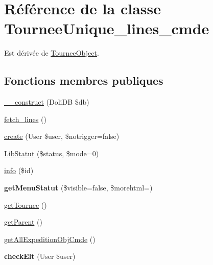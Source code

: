 \hypertarget{classTourneeUnique__lines__cmde}{}\section{Référence de la classe Tournee\+Unique\+\_\+lines\+\_\+cmde}
\label{classTourneeUnique__lines__cmde}


Est dérivée de \hyperlink{classTourneeObject}{Tournee\+Object}.

\subsection*{Fonctions membres publiques}
\begin{DoxyCompactItemize}
\item 
\hyperlink{classTourneeUnique__lines__cmde_aa371ccc9c9e140c39e1c3c64ad705696}{\+\_\+\+\_\+construct} (Doli\+DB \$db)
\item 
\hyperlink{classTourneeUnique__lines__cmde_a1c0accb832ebdf0da38a4c7769bbaf8c}{fetch\+\_\+lines} ()
\item 
\hyperlink{classTourneeUnique__lines__cmde_a1c9c3468a1f595203f05ac1dc8c230e5}{create} (User \$user, \$notrigger=false)
\item 
\hyperlink{classTourneeUnique__lines__cmde_af3dd7a88698021713f3bf14a7e45ecec}{Lib\+Statut} (\$status, \$mode=0)
\item 
\hyperlink{classTourneeUnique__lines__cmde_aa8ad4a8e54f9dfbbf513e6d9f32e2d8f}{info} (\$id)
\item 
\mbox{\label{classTourneeUnique__lines__cmde_a49d3a71fc14480a55491d9775e9a728b}} 
{\bfseries get\+Menu\+Statut} (\$visible=false, \$morehtml=\textquotesingle{}\textquotesingle{})
\item 
\hyperlink{classTourneeUnique__lines__cmde_aabbb2e2e93c17d969aad1261531841d9}{get\+Tournee} ()
\item 
\hyperlink{classTourneeUnique__lines__cmde_aa5efaa5cdbbeb74ea06a132be5af5832}{get\+Parent} ()
\item 
\hyperlink{classTourneeUnique__lines__cmde_aa5eaac268620b600a7693b318a2a596c}{get\+All\+Expedition\+Obj\+Cmde} ()
\item 
\mbox{\label{classTourneeUnique__lines__cmde_ae317608f71a1c81755185d83cbb9e304}} 
{\bfseries check\+Elt} (User \$user)
\item 

\end{DoxyCompactItemize}
